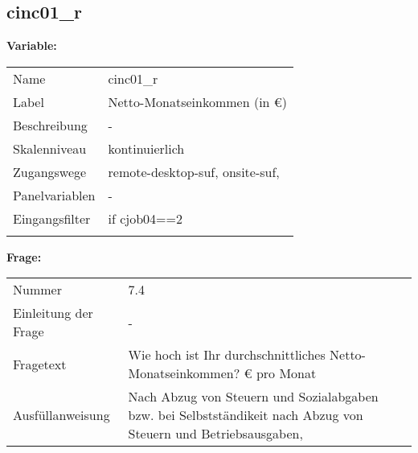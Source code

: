 	
	
	\subsection{cinc01\_r}
	\label{subSection:cinc01_r}

	\noindent\textbf{Variable:}\\
		\begin{tabular}{lL{11.3cm}}
			\label{tableVariable:cinc01_r}
			Name & cinc01\_r \\
			Label & Netto-Monatseinkommen (in €) \\
			Beschreibung & - \\
			Skalenniveau & kontinuierlich \\
			Zugangswege &
				remote-desktop-suf,
				onsite-suf,
 \\
			Panelvariablen & -
			 \\
			Eingangsfilter & if cjob04==2 \\
 \\
		\end{tabular}

		\vspace*{1 cm}
		\noindent\textbf{Frage:}\\
		\begin{tabular}{lL{11.3cm}}
			\label{tableQuestion:cinc01_r}
			Nummer & 7.4 \\
			Einleitung der Frage & - \\
			Fragetext & Wie hoch ist Ihr durchschnittliches Netto-Monatseinkommen?
€ pro Monat \\
			Ausfüllanweisung & Nach Abzug von Steuern und Sozialabgaben bzw. bei Selbstständikeit nach Abzug von Steuern und Betriebsausgaben, \\
		\end{tabular}




